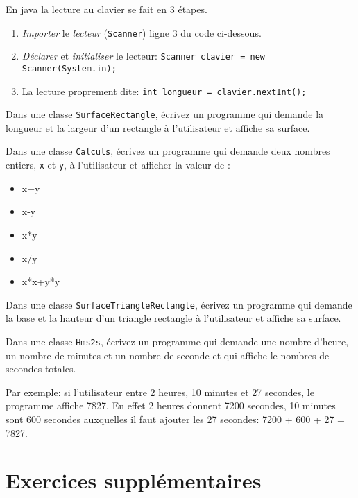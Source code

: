 \documentclass[a4paper,11pt]{article}
\begin{document}
	En java la lecture au clavier se fait en 3 étapes.

	\begin{enumerate}
		\item \emph{Importer} le \emph{lecteur} (\texttt{Scanner}) ligne 3 du code ci-dessous.
		\item \emph{Déclarer} et \emph{initialiser} le lecteur:  \texttt{Scanner clavier = new Scanner(System.in);}
		\item La lecture proprement dite: \texttt{int longueur = clavier.nextInt();}
	\end{enumerate}


	\hspeparator


		Dans une classe \texttt{SurfaceRectangle}, écrivez un programme qui demande 
		la longueur et la largeur d'un rectangle à l'utilisateur et affiche sa surface.


	\Exercice{} 
		Dans une classe \texttt{Calculs}, écrivez un programme qui demande 
		deux nombres entiers, \texttt{x} et \texttt{y}, à l'utilisateur et afficher la valeur de :
		\begin{itemize}
		 	\item x+y
			\item x-y
			\item x*y
			\item x/y
			\item x*x+y*y
		\end{itemize} 


		Dans une classe \texttt{SurfaceTriangleRectangle}, écrivez un programme qui demande 
		la base et la hauteur d'un triangle rectangle à l'utilisateur et affiche sa surface.

		Dans une classe \texttt{Hms2s}, écrivez un programme qui demande 
		une nombre d'heure, un nombre de minutes et un nombre de seconde
		et qui affiche le nombres de secondes totales.
		
		Par exemple: si l'utilisateur entre 2 heures, 10 minutes et 27 secondes, le programme affiche
		7827. En effet 2 heures donnent 7200 secondes, 10 minutes sont 600 secondes 
		auxquelles il faut ajouter les 27 secondes: 7200 + 600 + 27 = 7827. 




\section{Exercices supplémentaires}
\end{document}
